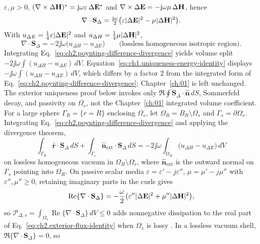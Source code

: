 $\varepsilon,\mu>0$,
$(\nabla\times\Delta\mathbf{H})^{*}=\mathrm{j}\omega\varepsilon\,\Delta\mathbf{E}^{*}$ and
$\nabla\times\Delta\mathbf{E}=-\mathrm{j}\omega\mu\,\Delta\mathbf{H}$, hence
\[
\nabla\cdot\mathbf{S}_\Delta
=
\tfrac{\mathrm{j}\omega}{2}
\big(\varepsilon|\Delta\mathbf{E}|^{2}-\mu|\Delta\mathbf{H}|^{2}\big).
\]
With $u_{\Delta E}=\tfrac14\varepsilon|\Delta\mathbf{E}|^{2}$ and
$u_{\Delta H}=\tfrac14\mu|\Delta\mathbf{H}|^{2}$,
\begin{equation}
\label{eq:ch2.poynting-difference-divergence}
\nabla\cdot\mathbf{S}_\Delta
=
-2\jj\omega\big(u_{\Delta H}-u_{\Delta E}\big)
\qquad\text{(lossless homogeneous isotropic region).}
\end{equation}
Integrating Eq.~\eqref{eq:ch2.poynting-difference-divergence} yields volume split
$-2\jj\omega\!\int(u_{\Delta H}-u_{\Delta E})\,dV$.
Equation~\eqref{eq:ch1.uniqueness-energy-identity} displays
$-\jj\omega\!\int(u_{\Delta H}-u_{\Delta E})\,dV$, which differs by a factor $2$ from the
integrated form of Eq.~\eqref{eq:ch2.poynting-difference-divergence}; Chapter~\ref{ch:01} is
left unchanged. The exterior uniqueness proof below invokes only
$\Re\oint\mathbf{S}_\Delta\cdot\hat{\mathbf{n}}\,dS$, Sommerfeld decay, and passivity on
$\Omega_s$, not the Chapter~\ref{ch:01} integrated volume coefficient.
For a large sphere \(\Gamma_R=\{r=R\}\) enclosing \(\Omega_s\), let
\(\Omega_R=B_R\setminus\Omega_s\) and $\Gamma_s=\partial\Omega_s$.
Integrating Eq.~\eqref{eq:ch2.poynting-difference-divergence} and applying the divergence theorem,
\begin{equation}
\label{eq:ch2.exterior-flux-identity}
\int_{\Gamma_R}\hat{\mathbf{r}}\cdot\mathbf{S}_\Delta\,dS
+
\int_{\Gamma_s}\hat{\mathbf{n}}_{\mathrm{ext}}\cdot\mathbf{S}_\Delta\,dS
=
-2\jj\omega\!\int_{\Omega_R}
\big(u_{\Delta H}-u_{\Delta E}\big)\,dV
\end{equation}
on lossless homogeneous vacuum in $\Omega_R\setminus\Omega_s$, where
$\hat{\mathbf{n}}_{\mathrm{ext}}$ is the outward normal on $\Gamma_s$ pointing into
$\Omega_R$.
On passive scalar media $\varepsilon=\varepsilon'-j\varepsilon''$, $\mu=\mu'-j\mu''$ with
$\varepsilon'',\mu''\geq0$, retaining imaginary parts in the curls gives
\[
\operatorname{Re}\{\nabla\cdot\mathbf{S}_\Delta\}
=
-\frac{\omega}{2}
\big(\varepsilon''|\Delta\mathbf{E}|^{2}+\mu''|\Delta\mathbf{H}|^{2}\big),
\]
so \(\mathcal{P}_{\Delta,s}=\int_{\Omega_s}\operatorname{Re}\{\nabla\cdot\mathbf{S}_\Delta\}\,dV\leq0\)
adds nonnegative dissipation to the real part of Eq.~\eqref{eq:ch2.exterior-flux-identity}
when $\Omega_s$ is lossy \cite{stratton1941,harrington2001}.
In a lossless vacuum shell, $\Re\{\nabla\cdot\mathbf{S}_\Delta\}=0$, so
